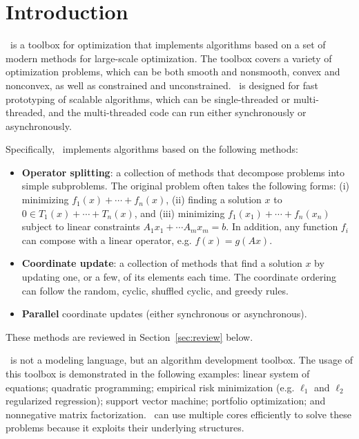 \section{Introduction}
\pkg~is a toolbox for optimization that implements algorithms based on a set of modern methods for large-scale optimization. The toolbox covers a variety of optimization problems, which can  be both smooth and nonsmooth, convex and nonconvex, as well as constrained and unconstrained.  \pkg~is designed for fast prototyping of scalable algorithms, which can be  single-threaded or multi-threaded, and the multi-threaded code can run either synchronously or asynchronously.

Specifically, \pkg~implements  algorithms based on  the following methods:
\begin{itemize}
\item \textbf{Operator splitting}: a collection of methods that decompose problems into simple subproblems. The original problem often takes the following forms: (i) minimizing $f_1(x)+\cdots+f_n(x)$, (ii) finding a solution $x$ to $0\in T_1(x)+\cdots +T_n(x)$, and (iii) minimizing $f_1(x_1)+\cdots+f_n(x_n)$ subject to linear constraints $A_1 x_1+\cdots A_m x_m=b$. In addition, any function $f_i$ can compose with a linear operator, e.g. $f(x) = g(Ax)$.

\item \textbf{Coordinate update}: a collection of methods that find a solution $x$ by updating one, or a few, of its elements each time. The coordinate ordering can follow the random, cyclic, shuffled cyclic, and greedy rules.

\item \textbf{Parallel} %
coordinate updates (either synchronous or asynchronous).
\end{itemize}
These methods are reviewed in Section~\ref{sec:review} below.

\pkg~is not a modeling language, but an algorithm development toolbox. %
The usage of this toolbox is demonstrated in the following examples:
 linear system of equations;
quadratic programming;
empirical risk minimization (e.g. $\ell_1$ and $\ell_2$ regularized  regression);
support vector machine;
portfolio optimization;
and nonnegative matrix factorization. \pkg~can use multiple cores efficiently to solve these  problems because it exploits their underlying structures. %

